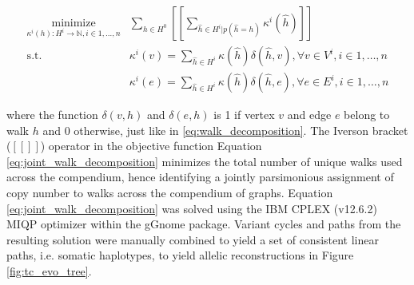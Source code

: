\documentclass[phd,tocprelim]{cornell}
\begin{document}
\begin{equation} \label{eq:joint_walk_decomposition}
    \begin{aligned}
        \underset{\kappa^i(h):H^i \rightarrow \mathbb{N}, i \in 1, \dots, n}{\text{minimize}} & \sum_{h \in H^0} [\![ \sum_{\hat{h} \in H^i | p(\hat{h} = h)} \kappa^i(\hat{h}) ]\!] \\
        \text{s.t. } & \kappa^i(v) = \sum_{\hat{h} \in H^i} \kappa(\hat{h})\delta(\hat{h}, v), \forall v \in V^i, i \in 1, \dots, n \\
        & \kappa^i(e) = \sum_{\hat{h} \in H^i} \kappa(\hat{h})\delta(\hat{h}, e), \forall e \in E^i, i \in 1, \dots, n
    \end{aligned}
\end{equation}

where the function $\delta(v,h)$ and $\delta(e,h)$ is 1 if vertex $v$ and edge $e$ belong to walk $h$ and 0 otherwise, just like in \ref{eq:walk_decomposition}. The Iverson bracket ($[\![]\!]$) operator in the objective function Equation \ref{eq:joint_walk_decomposition} minimizes the total number of unique walks used across the compendium, hence identifying a jointly parsimonious assignment of copy number to walks across the compendium of graphs. Equation \ref{eq:joint_walk_decomposition} was solved using the IBM CPLEX (v12.6.2) MIQP optimizer within the gGnome package. Variant cycles and paths from the resulting solution were manually combined to yield a set of consistent linear paths, i.e. somatic haplotypes, to yield allelic reconstructions in Figure \ref{fig:tc_evo_tree}.
\end{document}

